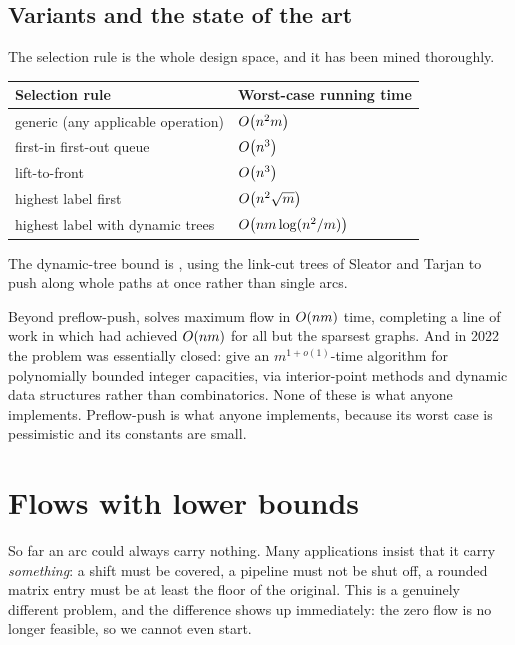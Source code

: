 \subsection{Variants and the state of the art}

The selection rule is the whole design space, and it has been mined thoroughly.

\begin{center}
\begin{tabular}{@{}ll@{}}
\toprule
\textbf{Selection rule} & \textbf{Worst-case running time} \\
\midrule
generic (any applicable operation) & $O\!\left(n^2m\right)$ \\
first-in first-out queue           & $O\!\left(n^3\right)$ \\
lift-to-front                      & $O\!\left(n^3\right)$ \\
highest label first                & $O\!\left(n^2\sqrt{m}\right)$ \\
highest label with dynamic trees   & $O\!\left(nm \log(n^2/m)\right)$ \\
\bottomrule
\end{tabular}
\end{center}

The dynamic-tree bound is \citet{GoldbergTarjan1988}, using the link-cut trees
of Sleator and Tarjan to push along whole paths at once rather than single arcs.

Beyond preflow-push, \citet{Orlin2013} solves maximum flow in $O\!\left(nm\right)$
time, completing a line of work in which \citet{KingRaoTarjan1994} had achieved
$O\!\left(nm\right)$ for all but the sparsest graphs. And in 2022 the problem was
essentially closed: \citet{ChenKyngLiuPengProbstGutenbergSachdeva2022} give an
$m^{1+o(1)}$-time algorithm for polynomially bounded integer capacities, via
interior-point methods and dynamic data structures rather than combinatorics.
None of these is what anyone implements. Preflow-push is what anyone
implements, because its worst case is pessimistic and its constants are small.

\section{Flows with lower bounds}
\label{sec:flow-lower-bounds}

So far an arc could always carry nothing. Many applications insist that it
carry \emph{something}: a shift must be covered, a pipeline must not be shut
off, a rounded matrix entry must be at least the floor of the original. This is
a genuinely different problem, and the difference shows up immediately: the
zero flow is no longer feasible, so we cannot even start.

